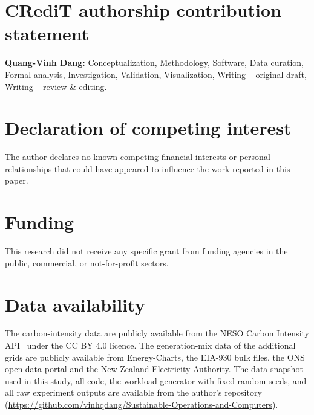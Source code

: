 \documentclass[preprint,12pt]{elsarticle}
\begin{document}
\linenumbers







\section*{CRediT authorship contribution statement}
\textbf{Quang-Vinh Dang:} Conceptualization, Methodology, Software, Data curation, Formal analysis, Investigation, Validation, Visualization, Writing -- original draft, Writing -- review \& editing.

\section*{Declaration of competing interest}
The author declares no known competing financial interests or personal relationships that could have appeared to influence the work reported in this paper.

\section*{Funding}
This research did not receive any specific grant from funding agencies in the public, commercial, or not-for-profit sectors.

\section*{Data availability}
The carbon-intensity data are publicly available from the NESO Carbon Intensity API~\cite{nesoapi} under the CC BY 4.0 licence. The generation-mix data of the additional grids are publicly available from Energy-Charts, the EIA-930 bulk files, the ONS open-data portal and the New Zealand Electricity Authority. The data snapshot used in this study, all code, the workload generator with fixed random seeds, and all raw experiment outputs are available from the author's repository (\url{https://github.com/vinhqdang/Sustainable-Operations-and-Computers}).

\appendix
\setcounter{figure}{0}\setcounter{table}{0}
\makeatletter{}\makeatother
\renewcommand{\thefigure}{\Alph{section}.\arabic{figure}}
\renewcommand{\thetable}{\Alph{section}.\arabic{table}}







\end{document}
